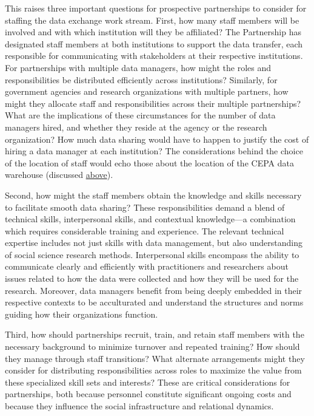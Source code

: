 \documentclass[
]{WileySix}
\begin{document}
This raises three important questions for prospective partnerships to consider for staffing the data exchange work stream. First, how many staff members will be involved and with which institution will they be affiliated? The Partnership has designated staff members at both institutions to support the data transfer, each responsible for communicating with stakeholders at their respective institutions. For partnerships with multiple data managers, how might the roles and responsibilities be distributed efficiently across institutions? Similarly, for government agencies and research organizations with multiple partners, how might they allocate staff and responsibilities across their multiple partnerships? What are the implications of these circumstances for the number of data managers hired, and whether they reside at the agency or the research organization? How much data sharing would have to happen to justify the cost of hiring a data manager at each institution? The considerations behind the choice of the location of staff would echo those about the location of the CEPA data warehouse (discussed \protect\hyperlink{data-warehouse}{above}).

Second, how might the staff members obtain the knowledge and skills necessary to facilitate smooth data sharing? These responsibilities demand a blend of technical skills, interpersonal skills, and contextual knowledge---a combination which requires considerable training and experience. The relevant technical expertise includes not just skills with data management, but also understanding of social science research methods. Interpersonal skills encompass the ability to communicate clearly and efficiently with practitioners and researchers about issues related to how the data were collected and how they will be used for the research. Moreover, data managers benefit from being deeply embedded in their respective contexts to be acculturated and understand the structures and norms guiding how their organizations function.

Third, how should partnerships recruit, train, and retain staff members with the necessary background to minimize turnover and repeated training? How should they manage through staff transitions? What alternate arrangements might they consider for distributing responsibilities across roles to maximize the value from these specialized skill sets and interests? These are critical considerations for partnerships, both because personnel constitute significant ongoing costs and because they influence the social infrastructure and relational dynamics.
\end{document}
